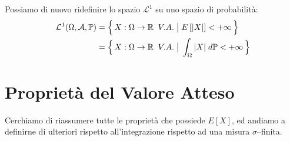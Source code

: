 \bigskip
\noindent Possiamo di nuovo ridefinire lo spazio $\mathcal{L}^1$ su uno spazio di probabilità:
\begin{align*}\mathcal{L}^1(\Omega, \mathcal{A}, \mathbb{P}) & = \Bigl\{\,X:\Omega \to \mathbb{R}\;\;  V.A.\;\big|\; E\left[|X|\right]<+\infty\,\Bigr\}\\
& =\Bigl\{\,X:\Omega \to \mathbb{R}\;\;  V.A.\;\big|\; \int_\Omega|X|\;d\mathbb{P}<+\infty\,\Bigr\}
\end{align*}

\newpage
\section{Proprietà del Valore Atteso}
Cerchiamo di riassumere tutte le proprietà che possiede $E[X]$, ed andiamo a definirne di ulteriori rispetto all'integrazione rispetto ad una misura $\sigma$--finita.
